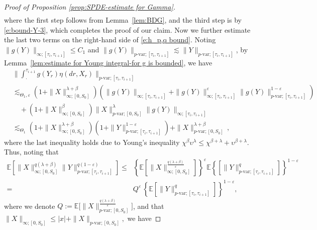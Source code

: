 \documentclass[11pt,reqno]{amsart}
\def\E{\mathbb E}
\numberwithin{equation}{section}
\begin{document}
\begin{proof}[Proof of Proposition \ref{prop:SPDE-estimate for Gamma}]
\begin{equation*}
\begin{aligned}
\end{aligned}
\end{equation*}
where the first step follows from Lemma~\ref{lem:BDG}, and the third step is by \eqref{e:bound-Y-3},
which completes the proof of our claim.
Now we further estimate the last two terms on the right-hand side of \eqref{e:h_p,q bound}.  Noting $\|g(Y)\|_{\infty;[\tau_{i},\tau_{i+1}]}\le C_{1}$ and $\|g(Y)\|_{p\text{-var};[\tau_{i},\tau_{i+1}]}\lesssim \|Y\|_{p\text{-var};[\tau_{i},\tau_{i+1}]}$, by Lemma~\ref{lem:estimate for Young integral-for g is bounded}, we have 
\begin{equation*}
\begin{aligned}
&\Big\|\int_{\cdot}^{\tau_{i+1}}g(Y_{r})\eta(dr,X_{r})\Big\|_{p\text{-var};[\tau_{i},\tau_{i+1}]}\\
&\lesssim_{\Theta_{1},\varepsilon}\left(1 + \|X\|^{\lambda + \beta}_{\infty;[0,S_{0}]}\right)\left(\|g(Y)\|_{\infty;[\tau_{i},\tau_{i+1}]} + \|g(Y)\|^{\varepsilon}_{\infty;[\tau_{i},\tau_{i+1}]}\|g(Y)\|^{1-\varepsilon}_{p\text{-var};[\tau_{i},\tau_{i+1}]} \right)\\
&\quad + \left(1 + \|X\|^{\beta}_{\infty;[0,S_{0}]}\right)\|X\|^{\lambda}_{p\text{-var};[0,S_{0}]}\|g(Y)\|_{\infty;[\tau_{i},\tau_{i+1}]}\\
&\lesssim_{\Theta_{1}} \left(1+\|X\|_{\infty;[0,S_{0}]}^{\lambda + \beta}\right)\left(1 + \|Y\|^{1-\varepsilon}_{p\text{-var};[\tau_{i},\tau_{i+1}]}\right) +  \|X\|^{\lambda+\beta}_{p\text{-var};[0,S_{0}]}\,,
\end{aligned}
\end{equation*}
where the last inequality holds due to Young's inequality $\chi^{\beta}\upsilon^{\lambda}\le \chi^{\beta+\lambda} + \upsilon^{\beta+\lambda}$.  Thus, 
noting that 
\begin{align*}\E \left[\|X\|_{\infty;[0,S_{0}]}^{q(\lambda + \beta)}\|Y\|^{q(1-\varepsilon)}_{p\text{-var};[\tau_{i},\tau_{i+1}]}\right]\le &\left\{\E \left[\|X\|_{\infty;[0,S_{0}]}^{\frac{q(\lambda + \beta)}{\varepsilon}}\right]\right\}^{\varepsilon} \E\left\{\left[\|Y\|^{q}_{p\text{-var};[\tau_{i},\tau_{i+1}]}\right]  \right\}^{1-\varepsilon}\\
= & Q^{\varepsilon}\, \left\{\E\left[\|Y\|^{q}_{p\text{-var};[\tau_{i},\tau_{i+1}]}\right]  \right\}^{1-\varepsilon},
\end{align*} 
where we denote $Q := \mathbb{E}\Big[\|X\|^{\frac{ q(\lambda + \beta)}{\varepsilon}}_{p\text{-var};[0,S_{0}]}\Big]$, and that 
$\|X\|_{\infty;[0,S_0]} \le |x| + \|X\|_{p\text{-var};[0,S_0]},$
we have  

\end{proof}
\end{document}
